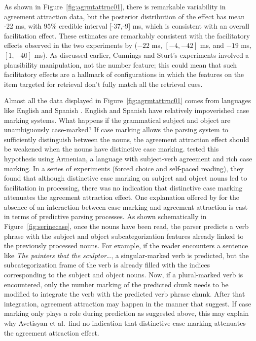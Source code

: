 \documentclass{cambridge7A}\usepackage[]{graphicx}\usepackage[]{color}
\begin{document}
 As shown in Figure~\ref{fig:agrmtattrnc01}, there is remarkable variability in agreement attraction data, but the posterior distribution of the effect has mean -22 ms, with 95\% credible interval [-37,-9] ms, which is consistent with an overall facilitation effect. These estimates are remarkably consistent with the facilitatory effects observed in the two experiments by \cite{CunningsSturt2018} ($-22$ ms, $[-4,-42]$ ms,  and $-19$ ms, $[1,-40]$ ms). As discussed earlier, Cunnings and Sturt's experiments involved a plausibility manipulation, not the number feature; this could mean that such facilitatory effects are a hallmark of configurations in which the features on the item targeted for retrieval don't fully match all the retrieval cues.

Almost all the data displayed in Figure~\ref{fig:agrmtattrnc01} comes from languages like English and Spanish \citep[an exception is][who investigated Arabic]{TuckerIdrissiAlmeida2015}. English and Spanish have relatively impoverished case marking systems. What happens if the grammatical subject and object are unambiguously case-marked? If case marking allows the parsing system to sufficiently distinguish between the nouns, the agreement attraction effect should be weakened when the nouns have distinctive  case marking. \cite{ALV2020} tested this hypothesis using  Armenian, a language with subject-verb agreement and rich case marking. In a series of experiments (forced choice and self-paced reading), they found that although distinctive case marking on subject and object nouns led to facilitation in processing, there was no indication that distinctive case marking  attenuates the  agreement attraction effect. One explanation offered by \cite{ALV2020} for the absence of an interaction between case marking and agreement attraction is cast in terms of predictive parsing processes. As shown schematically in Figure~\ref{fig:serinecase}, once the nouns have been read, the parser predicts a verb phrase with the subject and object  subcategorization features already linked to the previously processed nouns. For example, if the reader encounters a sentence like \textit{The painters that the sculptor\dots}, a singular-marked verb is predicted, but the subcategorization frame of the  verb is already filled with the  indices corresponding to the subject and object nouns. Now, if a plural-marked verb is encountered, only the number marking of the predicted chunk needs to be modified to integrate the verb with the predicted verb phrase chunk. After that integration, agreement attraction may happen in the manner that \cite{WagersLauPhillips2009} suggest. If case marking only plays a role during prediction as suggested above, 
this may explain why Avetisyan et al.\ find no indication that distinctive case marking attenuates the agreement attraction effect.  
\end{document}
